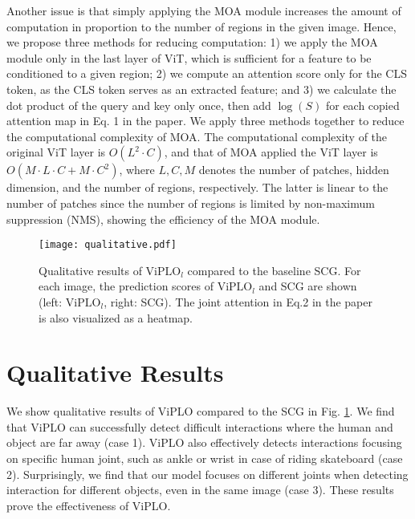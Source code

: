 \documentclass[10pt,twocolumn,letterpaper]{article}
\begin{document}
Another issue is that simply applying the MOA module increases the amount of computation in proportion to the number of regions in the given image. Hence, we propose three methods for reducing computation: 1) we apply the MOA module only in the last layer of ViT, which is sufficient for a feature to be conditioned to a given region; 2) we compute an attention score only for the CLS token, as the CLS token serves as an extracted feature; and 3) we calculate the dot product of the query and key only once, then add $\log(S)$ for each copied attention map in Eq. 1 in the paper. We apply three methods together to reduce the computational complexity of MOA. The computational complexity of the original ViT layer is $O(L^{2} \cdot C)$, and that of MOA applied the ViT layer is $O(M \cdot L \cdot C + M \cdot C^{2})$, where $L, C, M$ denotes the number of patches, hidden dimension, and the number of regions, respectively. The latter is linear to the number of patches since the number of regions is limited by non-maximum suppression (NMS), showing the efficiency of the MOA module. 


\begin{figure}[t]
\begin{center}

\texttt{[image: qualitative.pdf]}

\end{center}
\vspace{-5mm}
  \caption{Qualitative results of $\textrm{ViPLO}_{l}$ compared to the baseline SCG. For each image, the prediction scores of $\textrm{ViPLO}_{l}$ and SCG are shown (left: $\textrm{ViPLO}_{l}$, right: SCG). The joint attention in Eq.2 in the paper is also visualized as a heatmap.}
\vspace{-1mm}
\label{fig:qualitative}
\end{figure} 

\section{Qualitative Results}
\label{app:c}
We show qualitative results of ViPLO compared to the SCG in Fig. \ref{fig:qualitative}. We find that ViPLO can successfully detect difficult interactions where the human and object are far away (case 1). ViPLO also effectively detects interactions focusing on specific human joint, such as ankle or wrist in case of riding skateboard (case 2). Surprisingly, we find that our model focuses on different joints when detecting interaction for different objects, even in the same image (case 3). These results prove the effectiveness of ViPLO. 

 
\end{document}
